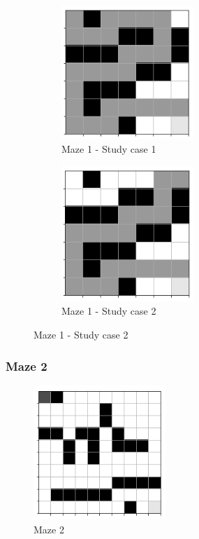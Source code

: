 \documentclass[a4paper]{article}    %
\begin{document}

\begin{figure}[H]
    \centering
    \begin{subfigure}{0.48\textwidth}
        \centering
        \includegraphics[width=5cm]{maze1-case1}
        \caption{Maze 1 - Study case 1}
        \label{fig:maze1-case1}
    \end{subfigure}
    \hfill
    \begin{subfigure}{0.48\textwidth}
        \centering
        \includegraphics[width=5cm]{maze1-case2}
        \caption{Maze 1 - Study case 2}
        \label{fig:maze1-case2}
    \end{subfigure}
\end{figure}

\newpage
\subsubsection{Maze 2}

\begin{figure}[H]
    \centering
    \includegraphics[width=5cm]{maze2-maze}
    \caption{Maze 2}
    \label{fig:maze2}
\end{figure}
\end{document}
